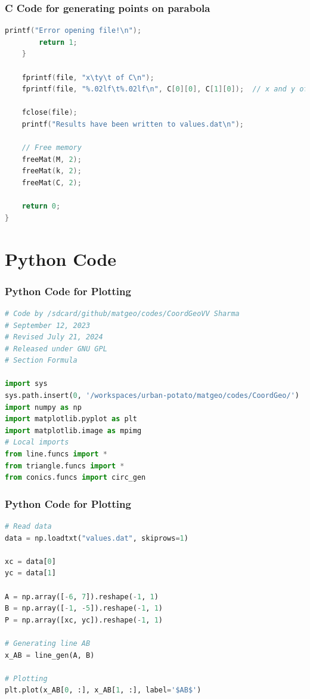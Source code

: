 \documentclass{beamer}
\theoremstyle{remark}
\numberwithin{equation}{section}
\begin{document}
\begin{frame}[fragile]
\frametitle{C Code for generating points on parabola}
\begin{lstlisting}[language=C]
       printf("Error opening file!\n");
        return 1;
    }

    fprintf(file, "x\ty\t of C\n");
    fprintf(file, "%.02lf\t%.02lf\n", C[0][0], C[1][0]);  // x and y of C

    fclose(file);
    printf("Results have been written to values.dat\n");

    // Free memory
    freeMat(M, 2);
    freeMat(k, 2);
    freeMat(C, 2);

    return 0;
}
\end{lstlisting}
\end{frame}

\section{Python Code}
\begin{frame}[fragile]
\frametitle{Python Code for Plotting}
\begin{lstlisting}[language=Python]
# Code by /sdcard/github/matgeo/codes/CoordGeoVV Sharma
# September 12, 2023
# Revised July 21, 2024
# Released under GNU GPL
# Section Formula

import sys
sys.path.insert(0, '/workspaces/urban-potato/matgeo/codes/CoordGeo/')  # path to my scripts
import numpy as np
import matplotlib.pyplot as plt
import matplotlib.image as mpimg
# Local imports
from line.funcs import *
from triangle.funcs import *
from conics.funcs import circ_gen

\end{lstlisting}
\end{frame}

\begin{frame}[fragile]
\frametitle{Python Code for Plotting}
\begin{lstlisting}[language=Python]
# Read data
data = np.loadtxt("values.dat", skiprows=1)

xc = data[0]
yc = data[1]

A = np.array([-6, 7]).reshape(-1, 1)
B = np.array([-1, -5]).reshape(-1, 1)
P = np.array([xc, yc]).reshape(-1, 1)

# Generating line AB
x_AB = line_gen(A, B)

# Plotting
plt.plot(x_AB[0, :], x_AB[1, :], label='$AB$')


\end{lstlisting}
\end{frame}
\end{document}
